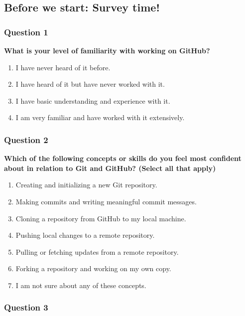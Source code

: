 \documentclass[
  letterpaper,
  DIV=11,
  numbers=noendperiod]{scrartcl}
\begin{document}
\subsection{Before we start: Survey
time!}\label{before-we-start-survey-time}

\subsubsection{Question 1}

\textbf{What is your level of familiarity with working on GitHub?}

\begin{enumerate}
\def\labelenumi{\alph{enumi}.}
\item
  I have never heard of it before.
\item
  I have heard of it but have never worked with it.
\item
  I have basic understanding and experience with it.
\item
  I am very familiar and have worked with it extensively.
\end{enumerate}

\subsubsection{Question 2}

\textbf{Which of the following concepts or skills do you feel most
confident about in relation to Git and GitHub? (Select all that apply)}

\begin{enumerate}
\def\labelenumi{\alph{enumi}.}
\item
  Creating and initializing a new Git repository.
\item
  Making commits and writing meaningful commit messages.
\item
  Cloning a repository from GitHub to my local machine.
\item
  Pushing local changes to a remote repository.
\item
  Pulling or fetching updates from a remote repository.
\item
  Forking a repository and working on my own copy.
\item
  I am not sure about any of these concepts.
\end{enumerate}

\subsubsection{Question 3}
\end{document}
